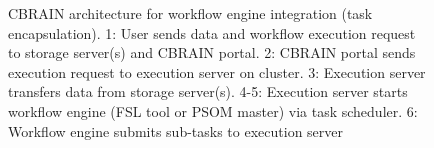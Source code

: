 \documentclass[preprint,3p,twocolumn]{elsarticle}
\begin{document}
{\begin{figure}
\centering
{} \hfill {}
\caption{CBRAIN architecture for workflow engine integration
  (task encapsulation).  1: User sends data and workflow execution request to
  storage server(s) and CBRAIN portal. 2: CBRAIN portal sends
  execution request to execution server on cluster. 3: Execution
  server transfers data from storage server(s). 4-5: Execution server
  starts workflow engine (FSL tool or PSOM master) via task
  scheduler. 6: Workflow engine submits sub-tasks to execution server
}
\end{figure}}
\end{document}

